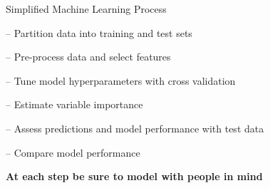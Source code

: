 \documentclass[ignorenonframetext,]{beamer}
\begin{document}
\begin{frame}{Simplified Machine Learning Process}

-- Partition data into training and test sets

-- Pre-process data and select features

-- Tune model hyperparameters with cross validation

-- Estimate variable importance

-- Assess predictions and model performance with test data

-- Compare model performance

\textbf{At each step be sure to model with people in mind}

\end{frame}
\end{document}
